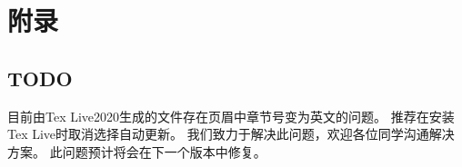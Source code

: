\chapter{附录}
\section{TODO}
目前由Tex Live2020生成的文件存在页眉中章节号变为英文的问题。
推荐在安装Tex Live时取消选择自动更新。
我们致力于解决此问题，欢迎各位同学沟通解决方案。
此问题预计将会在下一个版本中修复。
